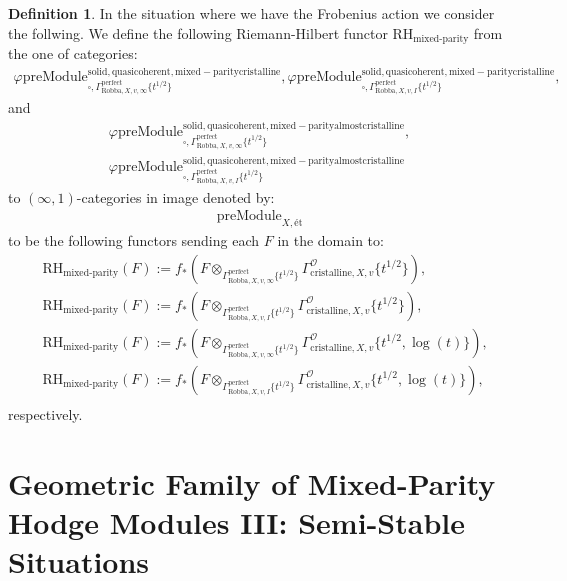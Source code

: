 \documentclass[12pt]{book}
\theoremstyle{definition}
\newtheorem{definition}{Definition}
\begin{document}
\begin{definition}
In the situation where we have the Frobenius action we consider the follwing. We define the following Riemann-Hilbert functor $\text{RH}_\text{mixed-parity}$ from the one of categories:
\begin{align}
\varphi\mathrm{preModule}^\mathrm{solid,quasicoherent,mixed-paritycristalline}_{\square,\Gamma^\mathrm{perfect}_{\text{Robba},X,v,\infty}\{t^{1/2}\}},
\varphi\mathrm{preModule}^\mathrm{solid,quasicoherent,mixed-paritycristalline}_{\square,\Gamma^\mathrm{perfect}_{\text{Robba},X,v,I}\{t^{1/2}\}}, 
\end{align}
and
\begin{align}
\varphi\mathrm{preModule}^\mathrm{solid,quasicoherent,mixed-parityalmostcristalline}_{\square,\Gamma^\mathrm{perfect}_{\text{Robba},X,v,\infty}\{t^{1/2}\}},\\
\varphi\mathrm{preModule}^\mathrm{solid,quasicoherent,mixed-parityalmostcristalline}_{\square,\Gamma^\mathrm{perfect}_{\text{Robba},X,v,I}\{t^{1/2}\}} 
\end{align}
to $(\infty,1)$-categories in image denoted by:
\begin{align}
\mathrm{preModule}_{X,\text{\'et}}
\end{align}
to be the following functors sending each $F$ in the domain to:
\begin{align}
&\text{RH}_\text{mixed-parity}(F):=f_*(F\otimes_{\Gamma^\mathrm{perfect}_{\text{Robba},X,v,\infty}\{t^{1/2}\}} \Gamma^\mathcal{O}_{\text{cristalline},X,v}\{t^{1/2}\}),\\
&\text{RH}_\text{mixed-parity}(F):=f_*(F\otimes_{\Gamma^\mathrm{perfect}_{\text{Robba},X,v,I}\{t^{1/2}\}} \Gamma^\mathcal{O}_{\text{cristalline},X,v}\{t^{1/2}\}),\\
&\text{RH}_\text{mixed-parity}(F):=f_*(F\otimes_{\Gamma^\mathrm{perfect}_{\text{Robba},X,v,\infty}\{t^{1/2}\}} \Gamma^\mathcal{O}_{\text{cristalline},X,v}\{t^{1/2},\log(t)\}),\\
&\text{RH}_\text{mixed-parity}(F):=f_*(F\otimes_{\Gamma^\mathrm{perfect}_{\text{Robba},X,v,I}\{t^{1/2}\}} \Gamma^\mathcal{O}_{\text{cristalline},X,v}\{t^{1/2},\log(t)\}),\\
\end{align}
respectively.

\end{definition}


\newpage
\section{Geometric Family of Mixed-Parity Hodge Modules III: Semi-Stable Situations}
\end{document}
